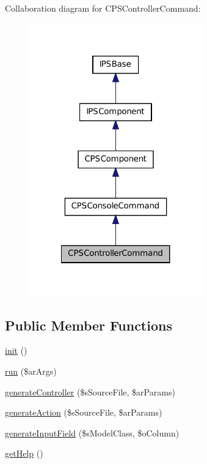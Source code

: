 Collaboration diagram for CPSControllerCommand:\nopagebreak
\begin{figure}[H]
\begin{center}
\leavevmode
\includegraphics[width=212pt]{classCPSControllerCommand__coll__graph}
\end{center}
\end{figure}
\subsection*{Public Member Functions}
\begin{DoxyCompactItemize}
\item 
\hyperlink{classCPSControllerCommand_a4be4055f3361d4800e16bc2e2e38cda6}{init} ()
\item 
\hyperlink{classCPSControllerCommand_a330e31e8c3572ce01a4e1c8485c6aedd}{run} (\$arArgs)
\item 
\hyperlink{classCPSControllerCommand_a49dc0a7897a19cca4729069259c39623}{generateController} (\$sSourceFile, \$arParams)
\item 
\hyperlink{classCPSControllerCommand_ac91a2aca5e06e754e38f13c4ef1b52f3}{generateAction} (\$sSourceFile, \$arParams)
\item 
\hyperlink{classCPSControllerCommand_a3a57c7a7020dbfaab8ae96210650be3e}{generateInputField} (\$sModelClass, \$oColumn)
\item 
\hyperlink{classCPSControllerCommand_a4cc928ef4def3a84c181608d31bf7608}{getHelp} ()
\end{DoxyCompactItemize}
